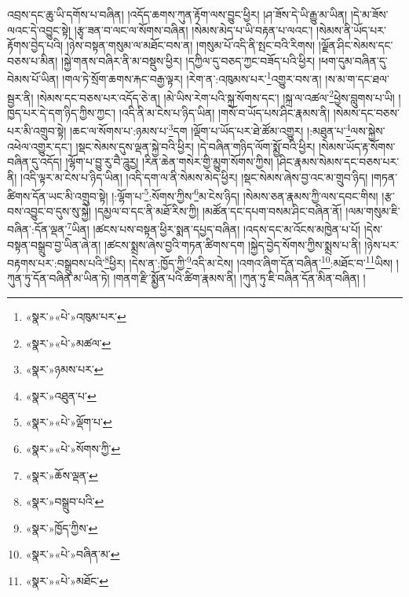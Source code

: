 འབྲས་དང་ཆུ་ཡི་དགོས་པ་བཞིན། །འདོད་ཆགས་ཀུན་རྟོག་ལས་བྱུང་ཕྱིར། །ཤ་ཟོས་དེ་ཡི་རྒྱུ་མ་ཡིན། །དེ་མ་ཟོས་ལའང་དེ་འབྱུང་སྟེ། །རྩྭ་ཟན་བ་ལང་ལ་སོགས་བཞིན། །སེམས་མེད་པ་ཡི་བརྟན་པ་ལའང་། །སེམས་ནི་ཡོད་པར་རྟོགས་བྱེད་པའི། །ཉེས་བསྟན་གསུམ་ལ་མཐོང་བས་ན། །གསུམ་པོ་འདི་ནི་སྤང་བའི་རིགས། །ལྗོན་ཤིང་སེམས་དང་བཅས་པ་མིན། །སྐྱེ་གནས་བཞིར་ནི་མ་བསྡུས་ཕྱིར། །དཀྱིལ་དུ་བཅད་ཀྱང་བཟོད་པའི་ཕྱིར། །ཕག་དུམ་བཞིན་དུ་བེམས་པོ་ཡིན། །གལ་ཏེ་སྲོག་ཆགས་རྐང་བརྒྱ་ལྟར། །རེག་ན་:འཁུམས་པར་\footnote{«སྣར་»«པེ་»འཁུམ་པར་}འགྱུར་བས་ན། །ས་མ་ག་དང་ཐལ་སྦྱར་ནི། །སེམས་དང་བཅས་པར་འདོད་ཅེ་ན། །མེ་ཡིས་རེག་པའི་སྐྲ་སོགས་དང་། །སྐྲ་ལ་འཚལ་\footnote{«སྣར་»«པེ་»མཚལ་}ཕྱེས་བླུགས་པ་ཡི། །ཁྱད་པར་དེ་དག་ཉིད་ཀྱིས་ཀྱང་། །འདི་ནི་མ་ངེས་པ་ཉིད་ཡིན། །གསོ་བ་ཡོད་པས་ཤིང་རྣམས་ནི། །སེམས་དང་བཅས་པར་མི་འགྲུབ་སྟེ། །ཆང་ལ་སོགས་པ་:ཉམས་པ་\footnote{«སྣར་»ཉམས་པར་}དག །ལྡོག་པ་ཡོད་པར་ཐེ་ཚོམ་འགྱུར། །:མཐུན་པ་\footnote{«སྣར་»འཐུན་པ་}ལས་སྐྱེས་འཕེལ་འགྱུར་དང་། །སྡང་སེམས་དུས་ལྡན་སྐྱེ་བའི་ཕྱིར། །དེ་བཞིན་གཉིད་ལོག་སྨྱོ་བའི་ཕྱིར། །སེམས་ཡོད་རྟ་སོགས་བཞིན་དུ་འདོད། །ལྷོག་པ་བྱུ་རུ་བཻ་ཌཱུརྱ། །རིན་ཆེན་གསེར་གྱི་མྱུག་སོགས་ཀྱིས། །ཤིང་རྣམས་སེམས་དང་བཅས་པར་ནི། །འདི་ལྟར་མ་ངེས་པ་ཉིད་ཡིན། །འདི་དག་ལ་ནི་སེམས་མེད་ཕྱིར། །སྡང་སེམས་ཞེས་བྱ་འང་མ་གྲུབ་ཉིད། །གཏན་ཚིགས་དོན་ཡང་མི་འགྲུབ་སྟེ། །:ལྷོག་པ་\footnote{«སྣར་»«པེ་»ལྡོག་པ་}:སོགས་ཀྱིས་\footnote{«སྣར་»«པེ་»སོགས་ཀྱི་}མ་ངེས་ཉིད། །སེམས་ཅན་རྣམས་ཀྱི་ལས་དབང་གིས། །རྩ་བས་འབྱུང་བ་དུས་སུ་སྐྱེ། །དམྱལ་བ་དང་ནི་མཐོ་རིས་ཀྱི། །མཚོན་དང་དཔག་བསམ་ཤིང་བཞིན་ནོ། །ལམ་གསུམ་ཇི་བཞིན་:དོན་ལྡན་\footnote{«སྣར་»ཆོས་ལྡན་}ཡིན། །ཚངས་པས་བསྟན་ཕྱིར་སྨན་དཔྱད་བཞིན། །འདས་དང་མ་འོངས་མཁྱེན་པ་པོ། །དེས་བསྟན་བསྒྲུབ་བྱ་ཡིན་ཞེ་ན། །ཚངས་སྨྲས་ཞེས་བྱའི་གཏན་ཚིགས་དག །སྐྱེད་བྱེད་སོགས་ཀྱིས་སྨྲས་པ་ནི། །ཉེས་པར་བརྟགས་པར་:བསྒྲུབས་པའི་\footnote{«སྣར་»བསྒྲུབ་པའི་}ཕྱིར། །དེས་ན་:ཁྱོད་ཀྱི་\footnote{«སྣར་»ཁྱོད་ཀྱིས་}འདི་མ་ངེས། །འགའ་ཞིག་དོན་བཞིན་\footnote{«སྣར་»«པེ་»བཞིན་མ་}:མཐོང་བ་\footnote{«སྣར་»«པེ་»མཐོང་}ཡིས། །ཀུན་ཏུ་དོན་བཞིན་མ་ཡིན་ཏེ། །གནག་རྫི་སྨྱོན་པའི་ཚིག་རྣམས་ནི། །ཀུན་ཏུ་ཇི་བཞིན་དོན་མིན་བཞིན། །
